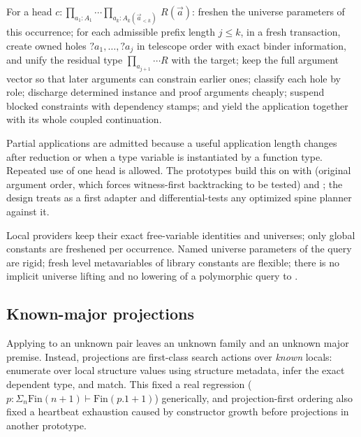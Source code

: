 \begin{definition}
For a head $c : \prod_{a_1:A_1}\cdots\prod_{a_k:A_k(\vec a_{<k})}\,R(\vec a)$: freshen the universe parameters of this occurrence; for each admissible prefix length $j \le k$, in a fresh transaction, create owned holes $?a_1,\dots,?a_j$ in telescope order with exact binder information, and unify the residual type $\prod_{a_{j+1}}\cdots R$ with the target; keep the full argument vector so that later arguments can constrain earlier ones; classify each hole by role; discharge determined instance and proof arguments cheaply; suspend blocked constraints with dependency stamps; and yield the application together with its whole coupled continuation.
\end{definition}

Partial applications are admitted because a useful application length changes after reduction or when a type variable is instantiated by a function type. Repeated use of one head is allowed. The prototypes build this on  with  (original argument order, which forces witness-first backtracking to be tested) and ; the design treats  as a first adapter and differential-tests any optimized spine planner against it.

Local providers keep their exact free-variable identities and universes; only global constants are freshened per occurrence. Named universe parameters of the query are rigid; fresh level metavariables of library constants are flexible; there is no implicit universe lifting and no lowering of a polymorphic query to .

\subsection{Known-major projections}

Applying  to an unknown pair leaves an unknown family and an unknown major premise. Instead, projections are first-class search actions over \emph{known} locals: enumerate  over local structure values using structure metadata, infer the exact dependent type, and match. This fixed a real regression ($p : \Sigma_n \mathrm{Fin}(n+1) \vdash \mathrm{Fin}(p.1 + 1)$) generically, and projection-first ordering also fixed a heartbeat exhaustion caused by constructor growth before projections in another prototype.

